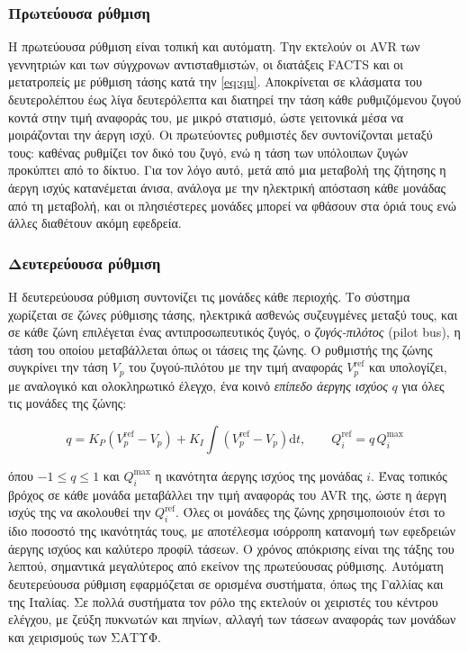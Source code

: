 \subsubsection{Πρωτεύουσα ρύθμιση}

Η πρωτεύουσα ρύθμιση είναι τοπική και αυτόματη. Την εκτελούν οι AVR των γεννητριών και των
σύγχρονων αντισταθμιστών, οι διατάξεις FACTS και οι μετατροπείς με ρύθμιση τάσης κατά την
\eqref{eq:qu}. Αποκρίνεται σε κλάσματα του δευτερολέπτου έως λίγα δευτερόλεπτα και διατηρεί
την τάση κάθε ρυθμιζόμενου ζυγού κοντά στην τιμή αναφοράς του, με μικρό στατισμό, ώστε
γειτονικά μέσα να μοιράζονται την άεργη ισχύ. Οι πρωτεύοντες ρυθμιστές δεν συντονίζονται μεταξύ
τους: καθένας ρυθμίζει τον δικό του ζυγό, ενώ η τάση των υπόλοιπων ζυγών προκύπτει από το
δίκτυο. Για τον λόγο αυτό, μετά από μια μεταβολή της ζήτησης η άεργη ισχύς κατανέμεται άνισα,
ανάλογα με την ηλεκτρική απόσταση κάθε μονάδας από τη μεταβολή, και οι πλησιέστερες μονάδες
μπορεί να φθάσουν στα όριά τους ενώ άλλες διαθέτουν ακόμη εφεδρεία.

\subsubsection{Δευτερεύουσα ρύθμιση}
\label{sec:v-secondary}

Η δευτερεύουσα ρύθμιση συντονίζει τις μονάδες κάθε περιοχής. Το σύστημα χωρίζεται σε
\emph{ζώνες} ρύθμισης τάσης, ηλεκτρικά ασθενώς συζευγμένες μεταξύ τους, και σε κάθε ζώνη
επιλέγεται ένας αντιπροσωπευτικός ζυγός, ο \emph{ζυγός-πιλότος} (pilot bus), η τάση του οποίου
μεταβάλλεται όπως οι τάσεις της ζώνης. Ο ρυθμιστής της ζώνης συγκρίνει την τάση $V_p$ του
ζυγού-πιλότου με την τιμή αναφοράς $V_p^{\mathrm{ref}}$ και υπολογίζει, με αναλογικό και
ολοκληρωτικό έλεγχο, ένα κοινό \emph{επίπεδο άεργης ισχύος} $q$ για όλες τις μονάδες της ζώνης:

\begin{equation}
q = K_P \left(V_p^{\mathrm{ref}} - V_p\right)
  + K_I \int \left(V_p^{\mathrm{ref}} - V_p\right) \mathrm{d}t, \qquad
Q_i^{\mathrm{ref}} = q\,Q_i^{\max}
\label{eq:svr}
\end{equation}

όπου $-1 \le q \le 1$ και $Q_i^{\max}$ η ικανότητα άεργης ισχύος της μονάδας $i$. Ένας τοπικός
βρόχος σε κάθε μονάδα μεταβάλλει την τιμή αναφοράς του AVR της, ώστε η άεργη ισχύς της να
ακολουθεί την $Q_i^{\mathrm{ref}}$. Όλες οι μονάδες της ζώνης χρησιμοποιούν έτσι το ίδιο ποσοστό
της ικανότητάς τους, με αποτέλεσμα ισόρροπη κατανομή των εφεδρειών άεργης ισχύος και καλύτερο
προφίλ τάσεων. Ο χρόνος απόκρισης είναι της τάξης του λεπτού, σημαντικά μεγαλύτερος από εκείνον
της πρωτεύουσας ρύθμισης. Αυτόματη δευτερεύουσα ρύθμιση εφαρμόζεται σε ορισμένα συστήματα,
όπως της Γαλλίας και της Ιταλίας. Σε πολλά συστήματα τον ρόλο της εκτελούν οι χειριστές του
κέντρου ελέγχου, με ζεύξη πυκνωτών και πηνίων, αλλαγή των τάσεων αναφοράς των μονάδων και
χειρισμούς των ΣΑΤΥΦ.

